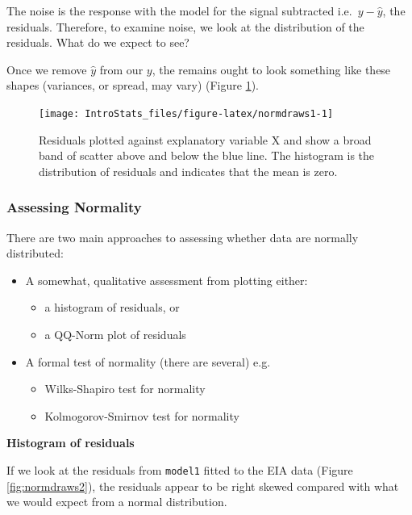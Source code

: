 \documentclass[
  oneside]{krantz}
\providecommand{\tightlist}{%
  \setlength{\itemsep}{0pt}\setlength{\parskip}{0pt}}
\begin{document}
The noise is the response with the model for the signal subtracted i.e.~\(y-\hat{y}\), the residuals. Therefore, to examine noise, we look at the distribution of the residuals. What do we expect to see?

Once we remove \(\hat{y}\) from our \(y\), the remains ought to look something like these shapes (variances, or spread, may vary) (Figure \ref{fig:normdraws1}).

\begin{figure}

{\centering \texttt{[image: IntroStats\_files/figure-latex/normdraws1-1]} 

}

\caption{Residuals plotted against explanatory variable X and show a broad band of scatter above and below the blue line. The histogram is the distribution of residuals and indicates that the mean is zero.}\label{fig:normdraws1}
\end{figure}

\hypertarget{assessing-normality}{%
\subsubsection{Assessing Normality}\label{assessing-normality}}

There are two main approaches to assessing whether data are normally distributed:

\begin{itemize}
\item
  A somewhat, qualitative assessment from plotting either:

  \begin{itemize}
  \tightlist
  \item
    a histogram of residuals, or
  \item
    a QQ-Norm plot of residuals
  \end{itemize}
\item
  A formal test of normality (there are several) e.g.

  \begin{itemize}
  \tightlist
  \item
    Wilks-Shapiro test for normality
  \item
    Kolmogorov-Smirnov test for normality
  \end{itemize}
\end{itemize}

\textbf{Histogram of residuals}

If we look at the residuals from \texttt{model1} fitted to the EIA data (Figure \ref{fig:normdraws2}), the residuals appear to be right skewed compared with what we would expect from a normal distribution.
\end{document}
